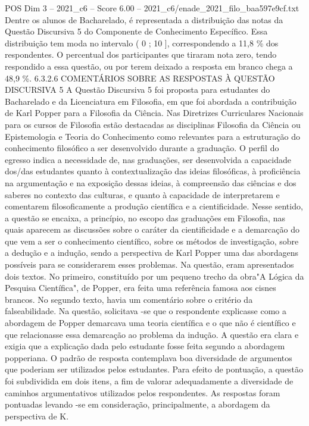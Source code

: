 \begin{textsample}{POS Dim 3 – 2021\_c6 – Score 6.00 – 2021\_c6/enade\_2021\_filo\_baa597e9cf.txt}
Dentre os alunos de Bacharelado, é representada a distribuição das notas da Questão Discursiva 5 do Componente de Conhecimento Específico.
Essa distribuição tem moda no intervalo ( 0 ; 10 ], correspondendo a 11,8 \% dos respondentes.
O percentual dos participantes que tiraram nota zero, tendo respondido a essa questão, ou por terem deixado a resposta em branco chega a 48,9 \%. 6.3.2.6 COMENTÁRIOS SOBRE AS RESPOSTAS À QUESTÃO DISCURSIVA 5 A Questão Discursiva 5 foi proposta para estudantes do Bacharelado e da Licenciatura em Filosofia, em que foi abordada a contribuição de Karl Popper para a Filosofia da Ciência.
Nas Diretrizes Curriculares Nacionais para os cursos de Filosofia estão destacadas as disciplinas Filosofia da Ciência ou Epistemologia e Teoria do Conhecimento como relevantes para a estruturação do conhecimento filosófico a ser desenvolvido durante a graduação.
O perfil do egresso indica a necessidade de, nas graduações, ser desenvolvida a capacidade dos/das estudantes quanto à contextualização das ideias filosóficas, à proficiência na argumentação e na exposição dessas ideias, à compreensão das ciências e dos saberes no contexto das culturas, e quanto à capacidade de interpretarem e comentarem filosoficamente a produção científica e a cientificidade.
Nesse sentido, a questão se encaixa, a princípio, no escopo das graduações em Filosofia, nas quais aparecem as discussões sobre o caráter da cientificidade e a demarcação do que vem a ser o conhecimento científico, sobre os métodos de investigação, sobre a dedução e a indução, sendo a perspectiva de Karl Popper uma das abordagens possíveis para se considerarem esses problemas.
Na questão, eram apresentados dois textos.
No primeiro, constituído por um pequeno trecho da obra"A Lógica da Pesquisa Científica", de Popper, era feita uma referência famosa aos cisnes brancos.
No segundo texto, havia um comentário sobre o critério da falseabilidade.
Na questão, solicitava -se que o respondente explicasse como a abordagem de Popper demarcava uma teoria científica e o que não é científico e que relacionasse essa demarcação ao problema da indução.
A questão era clara e exigia que a explicação dada pelo estudante fosse feita segundo a abordagem popperiana.
O padrão de resposta contemplava boa diversidade de argumentos que poderiam ser utilizados pelos estudantes.
Para efeito de pontuação, a questão foi subdividida em dois itens, a fim de valorar adequadamente a diversidade de caminhos argumentativos utilizados pelos respondentes.
As respostas foram pontuadas levando -se em consideração, principalmente, a abordagem da perspectiva de K.

\end{textsample}
